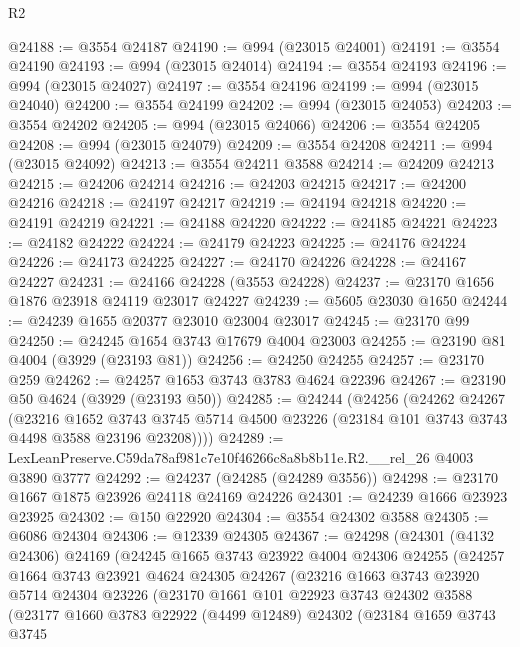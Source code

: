 \begin{lexlean}{R2}
\begin{coremodule}
@24188 := @3554 @24187
@24190 := @994 (@23015 @24001)
@24191 := @3554 @24190
@24193 := @994 (@23015 @24014)
@24194 := @3554 @24193
@24196 := @994 (@23015 @24027)
@24197 := @3554 @24196
@24199 := @994 (@23015 @24040)
@24200 := @3554 @24199
@24202 := @994 (@23015 @24053)
@24203 := @3554 @24202
@24205 := @994 (@23015 @24066)
@24206 := @3554 @24205
@24208 := @994 (@23015 @24079)
@24209 := @3554 @24208
@24211 := @994 (@23015 @24092)
@24213 := @3554 @24211 @3588
@24214 := @24209 @24213
@24215 := @24206 @24214
@24216 := @24203 @24215
@24217 := @24200 @24216
@24218 := @24197 @24217
@24219 := @24194 @24218
@24220 := @24191 @24219
@24221 := @24188 @24220
@24222 := @24185 @24221
@24223 := @24182 @24222
@24224 := @24179 @24223
@24225 := @24176 @24224
@24226 := @24173 @24225
@24227 := @24170 @24226
@24228 := @24167 @24227
@24231 := @24166 @24228 (@3553 @24228)
@24237 := @23170 @1656 @1876 @23918 @24119 @23017 @24227
@24239 := @5605 @23030 @1650
@24244 := @24239 @1655 @20377 @23010 @23004 @23017
@24245 := @23170 @99
@24250 := @24245 @1654 @3743 @17679 @4004 @23003
@24255 := @23190 @81 @4004 (@3929 (@23193 @81))
@24256 := @24250 @24255
@24257 := @23170 @259
@24262 := @24257 @1653 @3743 @3783 @4624 @22396
@24267 := @23190 @50 @4624 (@3929 (@23193 @50))
@24285 := @24244
    (@24256
      (@24262
        @24267
        (@23216
          @1652
          @3743
          @3745
          @5714
          @4500
          @23226
          (@23184 @101 @3743 @3743 @4498 @3588 @23196 @23208))))
@24289 := LexLeanPreserve.C59da78af981c7e10f46266c8a8b8b11e.R2.__rel_26 @4003 @3890 @3777
@24292 := @24237 (@24285 (@24289 @3556))
@24298 := @23170 @1667 @1875 @23926 @24118 @24169 @24226
@24301 := @24239 @1666 @23923 @23925
@24302 := @150 @22920
@24304 := @3554 @24302 @3588
@24305 := @6086 @24304
@24306 := @12339 @24305
@24367 := @24298
    (@24301
      (@4132 @24306)
      @24169
      (@24245
        @1665
        @3743
        @23922
        @4004
        @24306
        @24255
        (@24257
          @1664
          @3743
          @23921
          @4624
          @24305
          @24267
          (@23216
            @1663
            @3743
            @23920
            @5714
            @24304
            @23226
            (@23170
              @1661
              @101
              @22923
              @3743
              @24302
              @3588
              (@23177
                @1660
                @3783
                @22922
                (@4499 @12489)
                @24302
                (@23184
                  @1659
                  @3743
                  @3745

\end{coremodule}
\end{lexlean}
